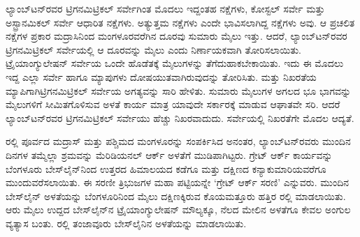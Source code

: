 ಲ್ಯಾಂಬ್​ಟನ್​ರವರ ಟ್ರಿಗನಮಿಟ್ರಿಕಲ್​ ಸರ್ವೇಗಿಂತ ಮೊದಲು ಇದ್ದಂತಹ ನಕ್ಷೆಗಳು, ಕೋಸ್ಟಲ್​ ಸರ್ವೇ ಮತ್ತು ಅಸ್ಟ್ರಾನಮಿಕಲ್​ ಸರ್ವೇ ಆಧಾರಿತ ನಕ್ಷೆಗಳು. ಅತ್ಯುತ್ತಮ ನಕ್ಷೆಗಳು ಎಂದೇ ಭಾವಿಸಲಾಗಿದ್ದ ನಕ್ಷೆಗಳು ಅವು. ಆ ಪ್ರಚಲಿತ ನಕ್ಷೆಗಳ ಪ್ರಕಾರ ಮದ್ರಾಸಿನಿಂದ ಮಂಗಳೂರವರೆಗಿನ ದೂರವು ಸುಮಾರು  ಮೈಲು ಇತ್ತು. ಆದರೆ, ಲ್ಯಾಂಬ್​ಟನ್​ರವರ ಟ್ರಿಗನಮಿಟ್ರಿಕಲ್​ ಸರ್ವೇಯಲ್ಲಿ ಆ ದೂರವನ್ನು  ಮೈಲು ಎಂದು ನಿರ್ಣಾಯಕವಾಗಿ ತೋರಿಸಲಾಯಿತು. ಟ್ರೈಯಾಂಗ್ಯುಲೇಷನ್​ ಸರ್ವೇಯ ಒಂದೇ ಹೊಡೆತಕ್ಕೆ  ಮೈಲುಗಳನ್ನು ತೆಗೆದುಹಾಕಬೇಕಾಯಿತು. ಇದು ಈ ಮೊದಲು ಇದ್ದ ಎಲ್ಲಾ ಸರ್ವೇ ಹಾಗೂ ಮ್ಯಾಪುಗಳು ದೋಷಯುತವಾಗಿರುವುದನ್ನು ತೋರಿಸಿತು. ಮತ್ತು ನಿಖರತೆಯ ಮ್ಯಾಪಿಗಾಗಿ\break ಟ್ರಿಗನಮಿಟ್ರಿಕಲ್​ ಸರ್ವೇಯ ಅಗತ್ಯವನ್ನು ಸಾರಿ ಹೇಳಿತು. ಸುಮಾರು  ಮೈಲುಗಳ ಅಗಲದ ಭೂ ಭಾಗವನ್ನು  ಮೈಲುಗಳಿಗೆ ಸೀಮಿತಗೊಳಿಸುವ ಅಳತೆ ಕಾರ್ಯ ಮಾತ್ರ ಯಾವುದೇ ಸರ್ಕಾರಕ್ಕೆ ಮಾಡುವ ಆಘಾತವೇ ಸರಿ. ಆದರೆ ಲ್ಯಾಂಬ್​ಟನ್​ರವರ ಟ್ರಿಗನಮಿಟ್ರಿಕಲ್​ ಸರ್ವೇಯು ಹೆಚ್ಚು ನಿಖರವಾದುದು. ಸರ್ವೇಯಲ್ಲಿ ನಿಖರತೆಗೇ ಮೊದಲ ಆದ್ಯತೆ.

ರಲ್ಲಿ ಪೂರ್ವದ ಮದ್ರಾಸ್​ ಮತ್ತು ಪಶ್ಚಿಮದ ಮಂಗಳೂರನ್ನು ಸಂಪರ್ಕಿಸಿದ ಅನಂತರ, ಲ್ಯಾಂಬ್​ಟನ್​ರವರು ಮುಂದಿನ ದಿನಗಳ ತಮ್ಮೆಲ್ಲಾ ಶ್ರಮವನ್ನು ಮೆರಿಡಿಯನಲ್​ ಆರ್ಕ್ ಅಳತೆಗೆ ಮುಡಿಪಾಗಿಟ್ಟರು. ಗ್ರೇಟ್​ ಆರ್ಕ್ ಕಾರ್ಯವನ್ನು ಬೆಂಗಳೂರು ಬೇಸ್​ಲೈನ್​\break ನಿಂದ ಉತ್ತರದ ಹಿಮಾಲಯದ ಕಡೆಗೂ ಮತ್ತು ದಕ್ಷಿಣದ ಕನ್ಯಾಕುಮಾರಿಯವರೆಗೂ ಮುಂದುವರೆಸಲಾಯಿತು. ಈ ಸರಣೀ ತ್ರಿಭುಜಗಳ ಮಹಾ ಪಟ್ಟಿಯನ್ನೇ ‘ಗ್ರೇಟ್​ ಆರ್ಕ್ ಸರಣಿ’ ಎನ್ನುವರು. ಮುಂದಿನ ಬೇಸ್​ಲೈನ್​ ಅಳತೆಯನ್ನು ಬೆಂಗಳೂರಿನಿಂದ  ಮೈಲು ದಕ್ಷಿಣಕ್ಕಿರುವ ಕೊಯಮತ್ತೂರು ಹತ್ತಿರ ರಲ್ಲಿ ಮಾಡಲಾಯಿತು. ಆರು ಮೈಲು ಉದ್ದದ ಬೇಸ್​ಲೈನ್​ನ ಟ್ರೈಯಾಂಗ್ಯುಲೇಷನ್​ ಮೌಲ್ಯಕ್ಕೂ, ನೆಲದ ಮೇಲಿನ ಅಳತೆಗೂ ಕೇವಲ  ಅಂಗುಲ ವ್ಯತ್ಯಾಸ ಬಂತು. ರಲ್ಲಿ ತಂಜಾವೂರು ಬೇಸ್​ಲೈನಿನ ಅಳತೆಯನ್ನು ಮಾಡಲಾಯಿತು.

